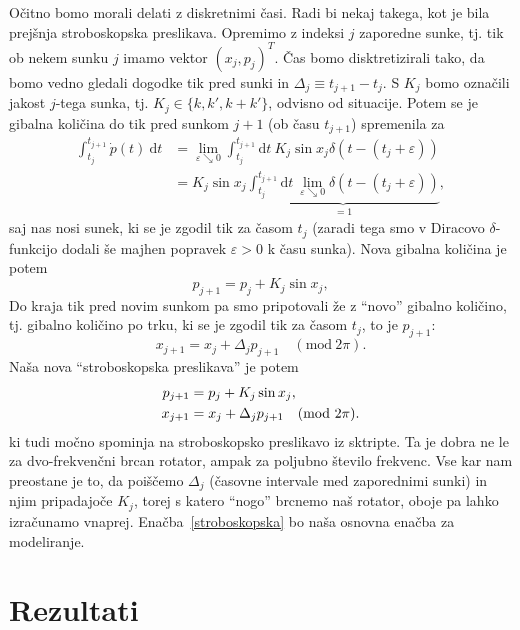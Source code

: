 \documentclass[a4paper, 12pt]{article}
\renewcommand{\d}{
	\ensuremath{\mathrm{d}}
}
\newcommand{\e}{
	\ensuremath{\varepsilon}
}
\begin{document}
O\v citno bomo morali delati z diskretnimi \v casi. Radi bi nekaj takega, kot je bila prej\v snja stroboskopska preslikava.
Opremimo z indeksi $j$ zaporedne sunke, tj. tik ob nekem sunku $j$ imamo vektor $(x_j, p_j)^T$. \v Cas bomo disktretizirali
tako, da bomo vedno gledali dogodke tik pred sunki in $\Delta_j \equiv t_{j+1} - t_j$. S $K_j$ bomo ozna\v cili jakost
$j$-tega sunka, tj. $K_j \in \{k, k', k + k'\}$, odvisno od situacije. Potem se je gibalna koli\v cina do tik pred
sunkom $j+1$ (ob \v casu $t_{j+1}$) spremenila za
\begin{align*}
	\int_{t_j}^{t_{j+1}} \dot{p}(t)\ \d t  &= \lim_{\e \searrow 0} \int_{t_j}^{t_{j+1}} \d t\ K_j \sin x_j
		\delta (t - (t_j + \e)) \\
		&= K_j \sin x_j \underbrace{\int_{t_j}^{t_{j+1}} \d t\ \lim_{\e \searrow 0} \delta(t - (t_j+\e))}_{ = 1},
\end{align*}
saj nas nosi sunek, ki se je zgodil tik za \v casom $t_j$ (zaradi tega smo v Diracovo $\delta$-funkcijo dodali \v se majhen
popravek $\e > 0$ k \v casu sunka). Nova gibalna koli\v cina je potem
\begin{equation*}
	p_{j+1} = p_j + K_j \sin x_j,
\end{equation*}
Do kraja tik pred novim sunkom pa smo pripotovali \v ze z "`novo"' gibalno koli\v cino, tj. gibalno
koli\v cino po trku, ki se je zgodil tik za \v casom $t_j$, to je $p_{j+1}$:
\begin{equation*}
	x_{j+1} = x_j + \Delta_j p_{j+1}\quad (\mathrm{mod}\ 2\pi).
\end{equation*}
Na\v sa nova "`stroboskopska preslikava"' je potem
\begin{align}
	p_{j+1} &= p_j + K_j \sin x_j, \notag \\
	x_{j+1} &= x_j + \Delta_j p_{j+1} \quad (\mathrm{mod}\ 2\pi).
	\label{stroboskopska}
\end{align}
ki tudi mo\v cno spominja na stroboskopsko preslikavo iz sktripte. Ta je dobra ne le za dvo-frekven\v cni
brcan rotator, ampak za poljubno \v stevilo frekvenc. Vse kar nam preostane je to, da poi\v s\v cemo $\Delta_j$ (\v casovne
intervale med zaporednimi sunki) in njim pripadajo\v ce $K_j$, torej s katero "`nogo"' brcnemo na\v s rotator, oboje pa lahko
izra\v cunamo vnaprej. Ena\v cba~\eqref{stroboskopska} bo na\v sa osnovna ena\v cba za modeliranje.

\section{Rezultati}
\end{document}
